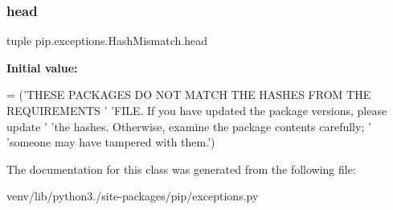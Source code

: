\subsubsection{\texorpdfstring{head}{head}}
{\footnotesize\ttfamily tuple pip.\+exceptions.\+Hash\+Mismatch.\+head\hspace{0.3cm}{\ttfamily [static]}}

{\bfseries Initial value\+:}
\begin{DoxyCode}
=  (\textcolor{stringliteral}{'THESE PACKAGES DO NOT MATCH THE HASHES FROM THE REQUIREMENTS '}
            \textcolor{stringliteral}{'FILE. If you have updated the package versions, please update '}
            \textcolor{stringliteral}{'the hashes. Otherwise, examine the package contents carefully; '}
            \textcolor{stringliteral}{'someone may have tampered with them.'})
\end{DoxyCode}


The documentation for this class was generated from the following file\+:\begin{DoxyCompactItemize}
\item 
venv/lib/python3./site-\/packages/pip/exceptions.\+py\end{DoxyCompactItemize}
